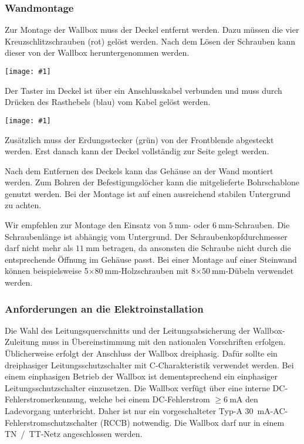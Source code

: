 \documentclass[a4paper,10pt]{article}
\newcommand{\hint}[1]{\begin{tcolorbox}[colback=boxgray,colframe=black,coltext=
white,title=Hinweis,left*=2mm,right*=2mm,boxsep=1mm,bottom=1mm,top=1mm]#1\end{tcolorbox}}
\newcommand{\gfx}[1]{\texttt{[image: \#1]}}
\begin{document}
\begin{multicols*}{2}
    \subsubsection{Wandmontage}\label{wandmontage}
    Zur Montage der Wallbox muss der Deckel entfernt werden. Dazu müssen die
    vier Kreuzschlitzschrauben (rot) gelöst werden.
    Nach dem Lösen der Schrauben kann dieser von der Wallbox heruntergenommen
    werden.

    \gfx{./img_warp3/resized/warp_screw_points_ready}


    \hint{Der Taster im Deckel ist über ein Anschlusskabel verbunden und muss
        durch Drücken des Rasthebels (blau) vom Kabel gelöst werden.}

    \gfx{./img_warp3/resized/warp3_frontLEDcable_arrow.jpg}

    Zusätzlich muss der Erdungsstecker (grün) von der Front\-blende abgesteckt werden.
    Erst danach kann der Deckel vollständig zur Seite gelegt werden.

    Nach dem Entfernen des Deckels kann das Gehäuse an der Wand montiert werden. Zum
    Bohren der Befestigungslöcher kann die mitgelieferte Bohrschablone genutzt
    werden. Bei der Montage ist auf einen ausreichend stabilen Untergrund zu
    achten.

    Wir empfehlen zur Montage den Einsatz von $\SI{5}{\milli\meter}$- oder
    $\SI{6}{\milli\meter}$-Schrauben. Die Schraubenlänge ist abhängig vom
    Untergrund. Der Schraubenkopfdurchmesser darf nicht mehr als
    $\SI{11}{\milli\meter}$ betragen, da ansonsten die Schraube nicht durch die
    entsprechende Öffnung im Gehäuse passt. Bei einer Montage auf einer Steinwand
    können beispielsweise 5$\times\SI{80}{\milli\meter}$-Holzschrauben
    mit 8$\times\SI{50}{\milli\meter}$-Dübeln verwendet werden.

    \subsubsection{Anforderungen an die Elektroinstallation}
    Die Wahl des Leitungsquerschnitts und der Lei\-tungs\-ab\-sicher\-ung der
    Wallbox-Zuleitung muss in Übereinstimmung mit den nationalen Vorschriften
    erfolgen. Üblicherweise erfolgt der Anschluss der Wallbox dreiphasig.
    Dafür sollte ein dreiphasiger Leitungsschutzschalter mit C-Charakteristik
    verwendet werden. Bei einem einphasigen Betrieb der Wallbox ist
    dementsprechend ein einphasiger Leitungsschutzschalter einzusetzen.
    Die Wallbox verfügt über eine interne DC-Fehlerstromerkennung, welche
    bei einem DC-Fehlerstrom $\geq \SI{6}{\milli\ampere}$ den Ladevorgang
    unterbricht. Daher ist nur ein vorgeschalteter Typ-A \SI{30}{\milli\ampere}-AC-Fehlerstromschutzschalter (RCCB)
    notwendig.
    Die Wallbox darf nur in einem TN~/~TT-Netz angeschlossen werden.


\end{multicols*}
\end{document}

